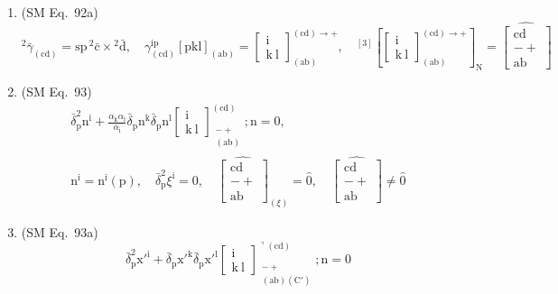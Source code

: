 \documentclass[12pt]{article}
\begin{document}
\begin{enumerate}[label=(\arabic*), series=formellist]
    \item (SM Eq.\ 92a) 
    \[
    {}^2\bar{\gamma}_{(\mathrm{cd})} = \mathrm{sp}\,{}^2\bar{\mathrm{c}} \times {}^2\bar{\mathrm{d}}, \quad \gamma_{(\mathrm{cd})}^{\mathrm{ip}}\left[\mathrm{pkl}\right]_{(\mathrm{ab})} = \left[ \begin{smallmatrix} \mathrm{i} \\ \mathrm{k\ l} \end{smallmatrix} \right]^{(\mathrm{cd}) \rightarrow +}_{(\mathrm{ab})}, \quad {}^{[3]}\left[ \left[ \begin{smallmatrix} \mathrm{i} \\ \mathrm{k\ l} \end{smallmatrix} \right]^{(\mathrm{cd}) \rightarrow +}_{(\mathrm{ab})} \right]_\mathrm{N} = \widehat{\left[ \begin{smallmatrix} \mathrm{cd} \\ - + \\ \mathrm{ab} \end{smallmatrix} \right]}
    \]

    \item (SM Eq.\ 93) 
    \[
    \begin{gathered}
    \bar{\delta}_\mathrm{p}^2 \mathrm{n^i} + \frac{\alpha_\mathrm{k} \alpha_\mathrm{l}}{\alpha_\mathrm{i}} \bar{\delta}_\mathrm{p} \mathrm{n^k} \bar{\delta}_\mathrm{p} \mathrm{n^l} \left[ \begin{smallmatrix} \mathrm{i} \\ \mathrm{k\ l} \end{smallmatrix} \right]^{(\mathrm{cd})}_{\substack{- + \\ (\mathrm{ab})}} ; \mathrm{n} = 0, \\
    \mathrm{n^i} = \mathrm{n^i}(\mathrm{p}), \quad \bar{\delta}_\mathrm{p}^2 \xi^\mathrm{i} = 0, \quad \widehat{\left[ \begin{smallmatrix} \mathrm{cd} \\ - + \\ \mathrm{ab} \end{smallmatrix} \right]}_{(\xi)} = \hat{0}, \quad \widehat{\left[ \begin{smallmatrix} \mathrm{cd} \\ - + \\ \mathrm{ab} \end{smallmatrix} \right]} \ne \hat{0}
    \end{gathered}
    \]

    \item (SM Eq.\ 93a) 
    \[
    \bar{\delta}_\mathrm{p}^2 \mathrm{x'^i} + \bar{\delta}_\mathrm{p} \mathrm{x'^k} \bar{\delta}_\mathrm{p} \mathrm{x'^l} \left[ \begin{smallmatrix} \mathrm{i} \\ \mathrm{k\ l} \end{smallmatrix} \right]^{\urcorner(\mathrm{cd})}_{\substack{- + \\ (\mathrm{ab})(\mathrm{C'})}} ; \mathrm{n} = 0
    \]


\end{enumerate}
\end{document}
